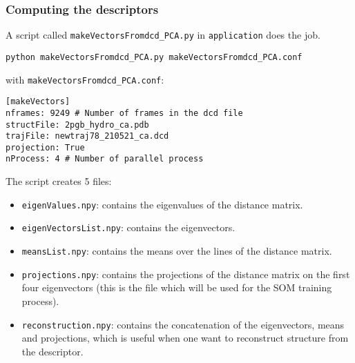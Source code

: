 \begin{frame}[fragile]
    \frametitle{Computing the descriptors}
        \footnotesize
        A script called \texttt{makeVectorsFromdcd\_PCA.py} in \texttt{application} does the job.
    \begin{lstlisting}
python makeVectorsFromdcd_PCA.py makeVectorsFromdcd_PCA.conf
    \end{lstlisting}
with \texttt{makeVectorsFromdcd\_PCA.conf}:
    \begin{lstlisting}
[makeVectors]
nframes: 9249 # Number of frames in the dcd file
structFile: 2pgb_hydro_ca.pdb
trajFile: newtraj78_210521_ca.dcd
projection: True
nProcess: 4 # Number of parallel process
    \end{lstlisting}
    The script creates 5 files:
    \begin{itemize}
        \item \texttt{eigenValues.npy}: contains the eigenvalues of the distance matrix.
        \item \texttt{eigenVectorsList.npy}: contains the eigenvectors.
        \item \texttt{meansList.npy}: contains the means over the lines of the distance matrix.
        \item \texttt{projections.npy}: contains the projections of the distance matrix on the first four eigenvectors (this is the file which will be used for the SOM training process).
        \item \texttt{reconstruction.npy}: contains the concatenation of the eigenvectors, means and projections, which is useful when one want to reconstruct structure from the descriptor.
    \end{itemize}
\end{frame}

